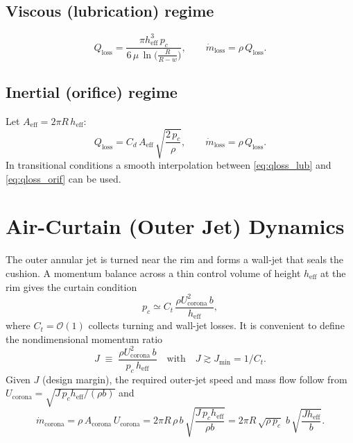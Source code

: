 \documentclass[11pt,a4paper]{article}
\begin{document}
\subsection*{Viscous (lubrication) regime}
\begin{equation}
  Q_{\mathrm{loss}}
  = \frac{\pi h_{\mathrm{eff}}^{3}\,p_c}{6\,\mu\,\ln\!\big(\tfrac{R}{R-w}\big)},
  \qquad \dot m_{\mathrm{loss}}=\rho\,Q_{\mathrm{loss}}.
  \label{eq:qloss_lub}
\end{equation}

\subsection*{Inertial (orifice) regime}
Let $A_{\mathrm{eff}}=2\pi R\,h_{\mathrm{eff}}$:
\begin{equation}
  Q_{\mathrm{loss}}
  = C_d\,A_{\mathrm{eff}}\,\sqrt{\frac{2\,p_c}{\rho}},
  \qquad \dot m_{\mathrm{loss}}=\rho\,Q_{\mathrm{loss}}.
  \label{eq:qloss_orif}
\end{equation}
In transitional conditions a smooth interpolation between \eqref{eq:qloss_lub} and \eqref{eq:qloss_orif} can be used.

\section{Air-Curtain (Outer Jet) Dynamics}
The outer annular jet is turned near the rim and forms a wall-jet that seals the cushion.
A momentum balance across a thin control volume of height $h_{\mathrm{eff}}$ at the rim gives the curtain condition
\begin{equation}
  p_c \simeq C_t\,\frac{\rho U_{\mathrm{corona}}^{2} \, b}{h_{\mathrm{eff}}},
  \label{eq:curtain_force}
\end{equation}
where $C_t=\mathcal{O}(1)$ collects turning and wall-jet losses.
It is convenient to define the nondimensional momentum ratio
\begin{equation}
  J\;\equiv\; \frac{\rho U_{\mathrm{corona}}^{2}\,b}{p_c\,h_{\mathrm{eff}}}
  \quad \text{with} \quad J\gtrsim J_{\min}=1/C_t.
  \label{eq:J}
\end{equation}
Given $J$ (design margin), the required outer-jet speed and mass flow follow from $U_{\mathrm{corona}}=\sqrt{J\,p_c h_{\mathrm{eff}}/(\rho b)}$ and
\begin{equation}
  \dot m_{\mathrm{corona}} = \rho\,A_{\mathrm{corona}}\,U_{\mathrm{corona}}
  = 2\pi R\,\rho\,b\,\sqrt{\frac{J\,p_c h_{\mathrm{eff}}}{\rho b}}
  = 2\pi R\,\sqrt{\rho\,p_c}\; b\,\sqrt{\frac{J h_{\mathrm{eff}}}{b}}.
  \label{eq:mcorona}
\end{equation}
\end{document}
